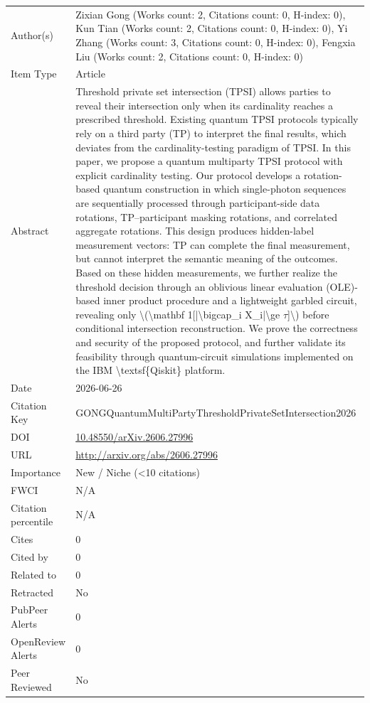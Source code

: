 \documentclass{article}
\begin{document}
\begin{enumerate}[label=\arabic*., font=\Large]
\begin{longtable}{p{} p{\contentcolwidth-2\tabcolsep}}
\toprule
Author(s) & Zixian Gong (Works count: 2, Citations count: 0, H-index: 0), Kun Tian (Works count: 2, Citations count: 0, H-index: 0), Yi Zhang (Works count: 3, Citations count: 0, H-index: 0), Fengxia Liu (Works count: 2, Citations count: 0, H-index: 0) \\
Item Type & Article \\
Abstract & Threshold private set intersection (TPSI) allows parties to reveal their intersection only when its cardinality reaches a prescribed threshold. Existing quantum TPSI protocols typically rely on a third party (TP) to interpret the final results, which deviates from the cardinality-testing paradigm of TPSI. In this paper, we propose a quantum multiparty TPSI protocol with explicit cardinality testing. Our protocol develops a rotation-based quantum construction in which single-photon sequences are sequentially processed through participant-side data rotations, TP--participant masking rotations, and correlated aggregate rotations. This design produces hidden-label measurement vectors: TP can complete the final measurement, but cannot interpret the semantic meaning of the outcomes. Based on these hidden measurements, we further realize the threshold decision through an oblivious linear evaluation (OLE)-based inner product procedure and a lightweight garbled circuit, revealing only \textbackslash{}(\textbackslash{}mathbf 1[|\textbackslash{}bigcap\_i X\_i|\textbackslash{}ge \ensuremath{\tau}]\textbackslash{}) before conditional intersection reconstruction. We prove the correctness and security of the proposed protocol, and further validate its feasibility through quantum-circuit simulations implemented on the IBM \textbackslash{}textsf\{Qiskit\} platform. \\
Date & 2026-06-26 \\
Citation Key & GONGQuantumMultiPartyThresholdPrivateSetIntersection2026 \\
DOI & \href{http://doi.org/10.48550/arXiv.2606.27996}{10.48550/arXiv.2606.27996} \\
URL & \url{http://arxiv.org/abs/2606.27996} \\
Importance & New / Niche (<10 citations) \\
FWCI & N/A \\
Citation percentile & N/A \\
Cites & 0 \\
Cited by & 0 \\
Related to & 0 \\
Retracted & No \\
PubPeer Alerts & 0 \\
OpenReview Alerts & 0 \\
Peer Reviewed & No \\
\bottomrule
\end{longtable}


\end{enumerate}
\end{document}

